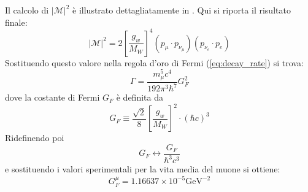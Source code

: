 \documentclass{subnucbo}
\begin{document}
Il calcolo di $| \mathcal { M } | ^ { 2 }$ è illustrato dettagliatamente in \cite{ref:hayes}. Qui si riporta il risultato finale:
\begin{equation}
         | \mathcal { M } | ^ { 2 }  = 2 \left[ \frac { g _ { w } } { M _ { W } } \right] ^ { 4 } \left( p _ { \mu } \cdot p _ { \nu _ { \mu } } \right) \left( p _ { \nu _ { e } } \cdot p _ { e } \right)
\end{equation}
Sostituendo questo valore nella regola d'oro di Fermi (\ref{eq:decay_rate}) si trova:
\begin{equation}
        \Gamma = \frac { m _ { \mu } ^ { 5 } c ^ { 4 } } { 192 \pi ^ { 3 } \hbar ^ { 7 } } G _ { F } ^ { 2 }
        \label{eq:muon_decay_rate}
\end{equation}
dove la costante di Fermi $G_{F}$ è definita da
\begin{equation}
        G _ { F } \equiv \frac { \sqrt { 2 } } { 8 } \left[ \frac { g _ { w } } { M _ { W } } \right] ^ { 2 } \cdot ( \hbar c ) ^ { 3 }
        \label{eq:fermi_constant}
\end{equation}
Ridefinendo poi
\begin{equation}
        G_{F} \leftrightarrow \frac{G_{F}}{\hbar^{3}c^{3}}
        \label{eq:fermi_constant_ridef}
\end{equation}
e sostituendo i valori sperimentali per la vita media del muone si ottiene:
\begin{equation}
        G^{\mu} _ { F } = 1.16637 \times 10 ^ { - 5 } \mathrm { GeV } ^ { - 2 }
        \label{eq:gf_muon_value}
\end{equation}
\end{document}
